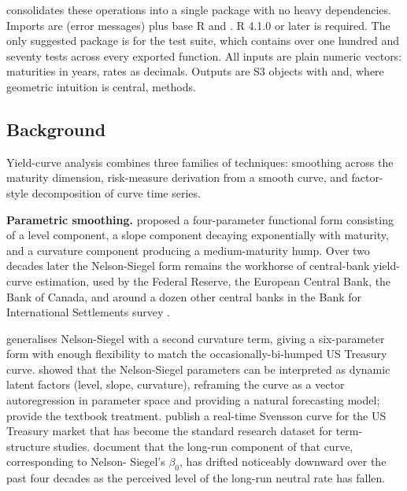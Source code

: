  consolidates these operations into a single
package with no heavy dependencies. Imports are  (error
messages) plus base R  and . R 4.1.0 or later
is required. The only suggested package is  for the
test suite, which contains over one hundred and seventy tests across
every exported function. All inputs are plain numeric vectors:
maturities in years, rates as decimals. Outputs are S3 objects with
 and, where geometric intuition is central, 
methods.

\subsection{Background}\label{background}

Yield-curve analysis combines three families of techniques: smoothing
across the maturity dimension, risk-measure derivation from a smooth
curve, and factor-style decomposition of curve time series.

\textbf{Parametric smoothing.} \citet{nelson1987parsimonious} proposed a
four-parameter functional form consisting of a level component, a slope
component decaying exponentially with maturity, and a curvature
component producing a medium-maturity hump. Over two decades later the
Nelson-Siegel form remains the workhorse of central-bank yield-curve
estimation, used by the Federal Reserve, the European Central Bank, the
Bank of Canada, and around a dozen other central banks in the Bank for
International Settlements survey \citep{bis2005zero}.

\citet{svensson1994estimating} generalises Nelson-Siegel with a second
curvature term, giving a six-parameter form with enough flexibility to
match the occasionally-bi-humped US Treasury curve.
\citet{diebold2006forecasting} showed that the Nelson-Siegel parameters
can be interpreted as dynamic latent factors (level, slope, curvature),
reframing the curve as a vector autoregression in parameter space and
providing a natural forecasting model; \citet{diebold2013yield} provide
the textbook treatment. \citet{gurkaynak2007us} publish a real-time
Svensson curve for the US Treasury market that has become the standard
research dataset for term-structure studies. \citet{bauer2020interest}
document that the long-run component of that curve, corresponding to
Nelson- Siegel's \(\beta_0\), has drifted noticeably downward over the
past four decades as the perceived level of the long-run neutral rate
has fallen.

